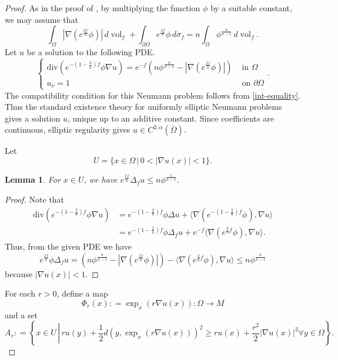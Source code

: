 \documentclass[psamsfonts]{amsart}
\newtheorem{lem}[thm]{Lemma}
\theoremstyle{definition}
\theoremstyle{remark}
\numberwithin{equation}{section}
\begin{document}
\begin{proof} As in the proof of \cite[Theorem 1.1]{Brendle2023}, by multiplying the function $\phi$ by a suitable constant, 
we may assume that  
\begin{equation}
 \int_\Omega \left|\nabla \left(e^{\frac{2f}{n}}\phi\right)\right|\,d\operatorname{vol}_f+  \int_{\partial \Omega} e^{\frac{2f}{n}}\phi \,d\sigma_{f} = n \int_\Omega \phi^{\frac{n}{n-1}} \,d\operatorname{vol}_f.   \label{int-equality}
\end{equation}
Let $u$ be a solution to the following PDE.
$$\begin{cases}
    \mathrm{div} \left( e^{-\left(1-\frac{2}{n} \right)f } \phi \nabla u  \right) =  e^{-f} \left( n  \phi^{\frac{n}{n-1}} - \left|\nabla \left( e^{\frac{2f}{n}}\phi \right)\right|\right) &\mbox{ in }\Omega\\
    u_\nu =1 &\mbox{ on  }\partial \Omega
\end{cases}.$$
The compatibility condition for this Neumann problem follows from \eqref{int-equality}.
Thus the standard existence theory for uniformly elliptic Neumann problems gives a solution $u$, unique up to an additive constant. Since coefficients are continuous, elliptic regularity gives $u \in C^{2,\alpha}(\overline{\Omega})$.

Let  \begin{equation} U = \{x \in \Omega\,| \, 0< |\nabla u(x)| <1\}.  \label{U} \end{equation}
\begin{lem} \label{Delta_f est}
    For $x \in U$, we have $e^{\frac{2f}{n}}  \Delta_f u\leq n \phi^{\frac{1}{n-1}}$.
\end{lem}
\begin{proof}
Note that
\begin{align*}
    \mathrm{div} \left( e^{-\left(1-\frac{2}{n} \right)f } \phi \nabla u  \right) 
    & = e^{-\left(1-\frac{2}{n} \right)f } \phi \Delta u  + \langle \nabla (e^{-\left(1-\frac{2}{n}\right)f } \phi),\nabla u \rangle\\
    & = e^{-(1-\frac{2}{n})f}\phi \Delta_f u + e^{-f} \langle \nabla (e^{\frac{2}{n}f}\phi ),\nabla u\rangle.
\end{align*}
Thus, from the given PDE we have
$$e^{\frac{2f}{n}} \phi \Delta_f u = \left( n  \phi^{\frac{n}{n-1}} - \left|\nabla \left( e^{\frac{2f}{n}}\phi \right)\right|\right)-\langle \nabla (e^{\frac{2}{n}f}\phi ),\nabla u\rangle \leq n\phi^{\frac{n}{n-1}}$$
because $|\nabla u(x)| <1$.
\end{proof}
For each $r >0$, define a map
$$\Phi_r ( x) : = \exp_x (r \nabla u (x)): \Omega \to M$$
and a set
$$A_r : = \left\{x\in U \, \left|\,  ru(y) + \frac{1}{2} d(y, \exp_x (r \nabla u (x)))^2 \geq ru(x) + \frac{r^2}{2} |\nabla u(x)|^2\right.\forall y \in \Omega\right\}.$$


\end{proof}
\end{document}
